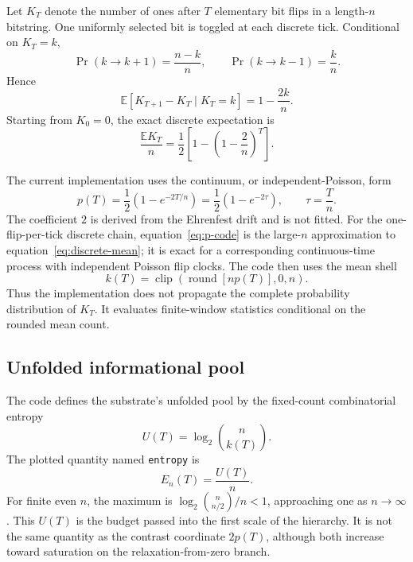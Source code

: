 \documentclass[11pt]{article}
\begin{document}
Let $K_T$ denote the number of ones after $T$ elementary bit flips in a
length-$n$ bitstring.  One uniformly selected bit is toggled at each discrete
tick.  Conditional on $K_T=k$,
\begin{equation}
 \Pr(k\to k+1)=\frac{n-k}{n},
 \qquad
 \Pr(k\to k-1)=\frac{k}{n}.
 \label{eq:birthdeath}
\end{equation}
Hence
\begin{equation}
 \mathbb{E}[K_{T+1}-K_T\mid K_T=k]=1-\frac{2k}{n}.
 \label{eq:drift}
\end{equation}
Starting from $K_0=0$, the exact discrete expectation is
\begin{equation}
 \frac{\mathbb{E}K_T}{n}
 =\frac12\left[1-\left(1-\frac2n\right)^T\right].
 \label{eq:discrete-mean}
\end{equation}

The current implementation uses the continuum, or independent-Poisson,
form
\begin{equation}
 p(T)=\frac12\left(1-e^{-2T/n}\right)
     =\frac12\left(1-e^{-2\tau}\right),
 \qquad \tau=\frac{T}{n}.
 \label{eq:p-code}
\end{equation}
The coefficient $2$ is derived from the Ehrenfest drift and is not fitted.
For the one-flip-per-tick discrete chain, equation~\eqref{eq:p-code} is the
large-$n$ approximation to equation~\eqref{eq:discrete-mean}; it is exact for
a corresponding continuous-time process with independent Poisson flip
clocks.  The code then uses the mean shell
\begin{equation}
 k(T)=\operatorname{clip}\!\left(
       \operatorname{round}[np(T)],0,n\right).
 \label{eq:k-code}
\end{equation}
Thus the implementation does not propagate the complete probability
distribution of $K_T$.  It evaluates finite-window statistics conditional on
the rounded mean count.

\subsection{Unfolded informational pool}

The code defines the substrate's unfolded pool by the fixed-count
combinatorial entropy
\begin{equation}
 U(T)=\log_2\binom{n}{k(T)}.
 \label{eq:unfolded}
\end{equation}
The plotted quantity named \texttt{entropy} is
\begin{equation}
 E_n(T)=\frac{U(T)}{n}.
 \label{eq:entropy-normalized}
\end{equation}
For finite even $n$, the maximum is
$\log_2\binom{n}{n/2}/n<1$, approaching one as $n\to\infty$.
This $U(T)$ is the budget passed into the first scale of the hierarchy.
It is not the same quantity as the contrast coordinate $2p(T)$, although
both increase toward saturation on the relaxation-from-zero branch.
\end{document}
